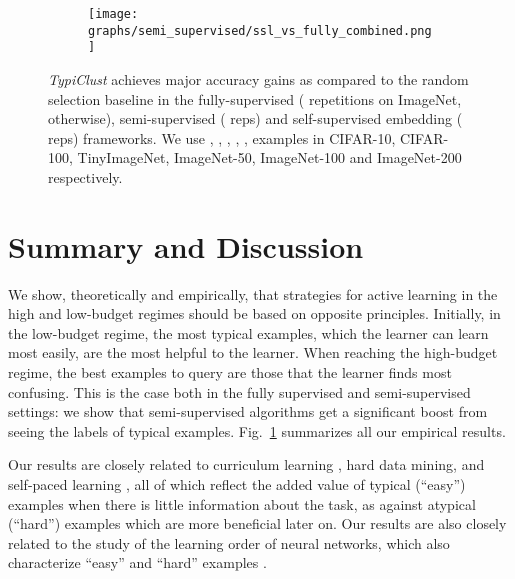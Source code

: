 \documentclass{article}
\begin{document}
\begin{figure}[htb!]
\begin{center}
    \begin{subfigure}{.46\textwidth}
      \centering
      \texttt{[image: graphs/semi\_supervised/ssl\_vs\_fully\_combined.png]}
\vspace{-0.5cm}
    \end{subfigure}
\vspace{-0.25cm}
\caption{
\textit{TypiClust} achieves major accuracy gains as compared to the random selection baseline in the fully-supervised ( repetitions on ImageNet,  otherwise), semi-supervised ( reps) and self-supervised embedding ( reps) frameworks. We use , , , , ,  examples in CIFAR-10, CIFAR-100, TinyImageNet, ImageNet-50, ImageNet-100 and ImageNet-200 respectively.}\vspace{-0.7cm}
\label{fig:semi_supervised_vs_fully_acc_improvement}
\end{center}
\end{figure}

\section{Summary and Discussion}
We show, theoretically and empirically, that strategies for active learning in the high and low-budget regimes should be based on opposite principles. Initially, in the low-budget regime, the most typical examples, which the learner can learn most easily, are the most helpful to the learner. When reaching the high-budget regime, the best examples to query are those that the learner finds most confusing. This is the case both in the fully supervised and semi-supervised settings: we show that semi-supervised algorithms get a significant boost from seeing the labels of typical examples. Fig.~\ref{fig:semi_supervised_vs_fully_acc_improvement} summarizes all our empirical results.



Our results are closely related to curriculum learning \citep{bengio2009curriculum,hacohen2019power,weinshall2020theory}, hard data mining, and self-paced learning \citep{kumar2010self}, all of which reflect the added value of typical (``easy'') examples when there is little information about the task, as against atypical (``hard'') examples  which are more beneficial later on. Our results are also closely related to the study of the learning order of neural networks, which also characterize ``easy'' and ``hard'' examples \citet{gissin2019discriminative,hacohen2020let,shah2020pitfalls,hacohen2021principal,choshen2021grammar}.
\end{document}
